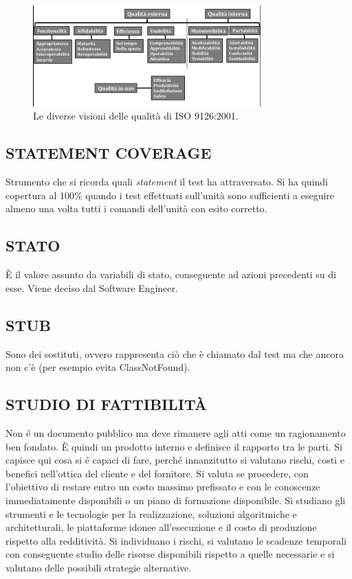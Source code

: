 			\begin{figure}[H]
				\centering
				\includegraphics[width=0.78\textwidth]{img/9126}
				\caption{Le diverse visioni delle qualità di ISO 9126:2001.}
			\end{figure}


		\subsection{STATEMENT COVERAGE}	\label{statementcoverage}	
		Strumento che si ricorda quali \textit{statement} il test ha attraversato. Si ha quindi copertura al 100\% quando i test effettuati sull'unità sono sufficienti a eseguire almeno una volta tutti i comandi dell'unità con esito corretto.


		\subsection{STATO}  \label{stato}
		È il valore assunto da variabili di stato, conseguente ad azioni precedenti su di esse. Viene deciso dal Software Engineer.

		\subsection{STUB}		\label{stub}
		Sono dei sostituti, ovvero rappresenta ciò che è chiamato dal test ma che ancora non c'è (per esempio evita ClassNotFound).

		\subsection{STUDIO DI FATTIBILITÀ}  \label{studiofattibilita}
		Non é un documento pubblico ma deve rimanere agli atti come un ragionamento ben fondato. È quindi un prodotto interno e definisce il rapporto tra le parti. Si capisce qui cosa si é capaci di fare, perché innanzitutto si valutano rischi, costi e benefici nell'ottica del cliente e del fornitore. Si valuta se procedere, con l’obiettivo di restare entro un costo massimo prefissato e con le conoscenze immediatamente disponibili o un piano di formazione disponibile. Si studiano gli strumenti e le tecnologie per la realizzazione, soluzioni algoritmiche e architetturali, le piattaforme idonee all'esecuzione e il costo di produzione rispetto alla redditività. Si individuano i rischi, si valutano le scadenze temporali con conseguente studio delle risorse disponibili rispetto a quelle necessarie e si valutano delle possibili strategie alternative.
